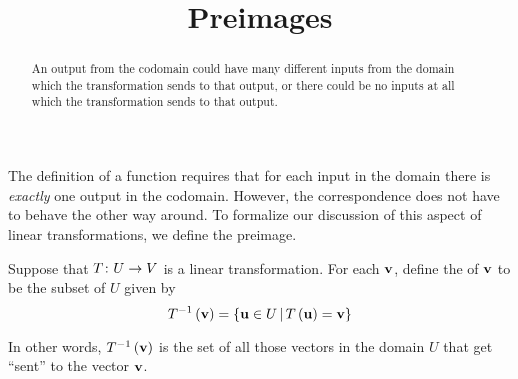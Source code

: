 \documentclass{ximera}
\title{Preimages}
\begin{document}
\begin{abstract}
An output from the codomain could have many different inputs from the domain which the transformation sends to that output, or there could be no inputs at all which the transformation sends to that output.
\end{abstract}
\maketitle


The definition of a function requires that for each input in the
domain there is \textit{exactly} one output in the codomain.  However,
the correspondence does not have to behave the other way around.  To
formalize our discussion of this aspect of linear transformations, we
define the preimage.

\begin{definition}[Preimage]

Suppose that $T\colon U\rightarrow V$ is a linear transformation.  For each $\mathbf{v}$, define the  of $\mathbf{v}$ to be the subset of $U$ given by
\[
T^{-1}\left(\mathbf{v}\right)=\left\lbrace\mathbf{u}\in U\,\middle|\,T\left(\mathbf{u}\right)=\mathbf{v}\right\rbrace
\]

\end{definition}

In other words, $T^{-1}\left(\mathbf{v}\right)$ is the set of all those vectors in the domain $U$ that get ``sent'' to the vector $\mathbf{v}$.
\end{document}
